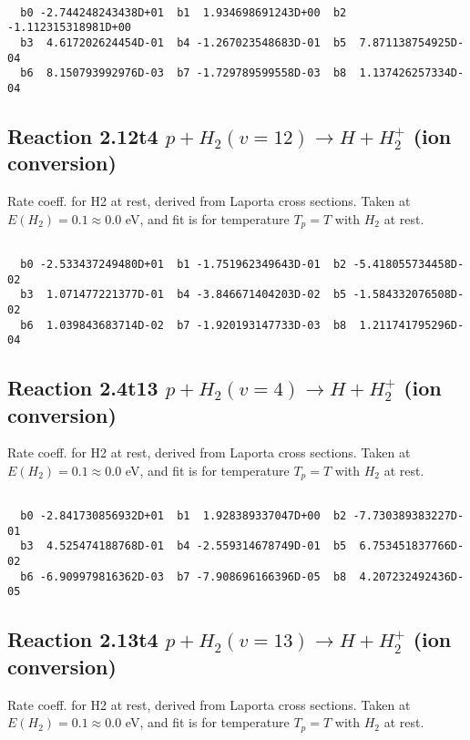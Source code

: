 \begin{small}\begin{verbatim}

  b0 -2.744248243438D+01  b1  1.934698691243D+00  b2 -1.112315318981D+00
  b3  4.617202624454D-01  b4 -1.267023548683D-01  b5  7.871138754925D-04
  b6  8.150793992976D-03  b7 -1.729789599558D-03  b8  1.137426257334D-04

\end{verbatim}\end{small}

\newpage
\subsection{
Reaction 2.12t4
$ p + H_2(v=12) \rightarrow H + H_2^+$ (ion conversion)
}
Rate coeff. for H2 at rest, derived from Laporta cross sections.
Taken at $E(H_2) = 0.1 \approx 0.0$ eV,  and fit is for temperature $T_p=T$ with $H_2$ at rest.

\begin{small}\begin{verbatim}

  b0 -2.533437249480D+01  b1 -1.751962349643D-01  b2 -5.418055734458D-02
  b3  1.071477221377D-01  b4 -3.846671404203D-02  b5 -1.584332076508D-02
  b6  1.039843683714D-02  b7 -1.920193147733D-03  b8  1.211741795296D-04

\end{verbatim}\end{small}

\newpage
\subsection{
Reaction 2.4t13
$ p + H_2(v=4) \rightarrow H + H_2^+$ (ion conversion)
}
Rate coeff. for H2 at rest, derived from Laporta cross sections.
Taken at $E(H_2) = 0.1 \approx 0.0$ eV,  and fit is for temperature $T_p=T$ with $H_2$ at rest.

\begin{small}\begin{verbatim}

  b0 -2.841730856932D+01  b1  1.928389337047D+00  b2 -7.730389383227D-01
  b3  4.525474188768D-01  b4 -2.559314678749D-01  b5  6.753451837766D-02
  b6 -6.909979816362D-03  b7 -7.908696166396D-05  b8  4.207232492436D-05

\end{verbatim}\end{small}

\newpage
\subsection{
Reaction 2.13t4
$ p + H_2(v=13) \rightarrow H + H_2^+$ (ion conversion)
}
Rate coeff. for H2 at rest, derived from Laporta cross sections.
Taken at $E(H_2) = 0.1 \approx 0.0$ eV,  and fit is for temperature $T_p=T$ with $H_2$ at rest.

